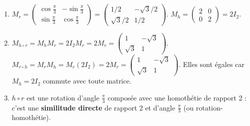 \documentclass[11pt]{article}
\begin{document}
\begin{corrige}[Exercice 3]
\begin{enumerate}
  \item $M_r = \begin{pmatrix} \cos\frac{\pi}{3} & -\sin\frac{\pi}{3} \\ \sin\frac{\pi}{3} & \cos\frac{\pi}{3} \end{pmatrix} = \begin{pmatrix} 1/2 & -\sqrt{3}/2 \\ \sqrt{3}/2 & 1/2 \end{pmatrix}$.
  $M_h = \begin{pmatrix} 2 & 0 \\ 0 & 2 \end{pmatrix} = 2I_2$.
  \item $M_{h\circ r} = M_h M_r = 2I_2 M_r = 2M_r = \begin{pmatrix} 1 & -\sqrt{3} \\ \sqrt{3} & 1 \end{pmatrix}$.
  $M_{r\circ h} = M_r M_h = M_r (2I_2) = 2M_r = \begin{pmatrix} 1 & -\sqrt{3} \\ \sqrt{3} & 1 \end{pmatrix}$.
  Elles sont égales car $M_h = 2I_2$ commute avec toute matrice.
  \item $h\circ r$ est une rotation d'angle $\frac{\pi}{3}$ composée avec une homothétie de rapport 2 : c'est une \textbf{similitude directe} de rapport 2 et d'angle $\frac{\pi}{3}$ (ou rotation-homothétie).
\end{enumerate}
\end{corrige}
\end{document}
